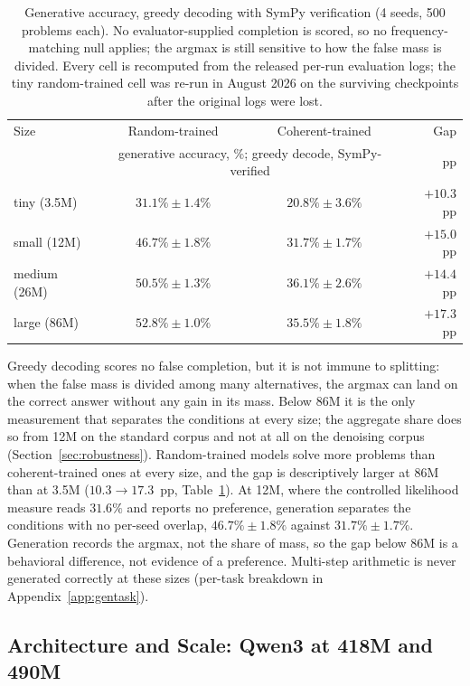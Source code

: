 \documentclass{article}
\begin{document}
\begin{table}[t]
\centering
\small
\begin{tabular}{lccr}
\toprule
Size & Random-trained & Coherent-trained & Gap \\
 & \multicolumn{2}{c}{generative accuracy, \%; greedy decode, SymPy-verified} & pp \\
\midrule
tiny (3.5M)   & $31.1\% \pm 1.4\%$ & $20.8\% \pm 3.6\%$ & $+10.3$ pp \\
small (12M)   & $46.7\% \pm 1.8\%$ & $31.7\% \pm 1.7\%$ & $+15.0$ pp \\
medium (26M)  & $50.5\% \pm 1.3\%$ & $36.1\% \pm 2.6\%$ & $+14.4$ pp \\
large (86M)   & $52.8\% \pm 1.0\%$ & $35.5\% \pm 1.8\%$ & $+17.3$ pp \\
\bottomrule
\end{tabular}
\caption{Generative accuracy, greedy decoding with SymPy verification (4 seeds, 500 problems each). No evaluator-supplied completion is scored, so no frequency-matching null applies; the argmax is still sensitive to how the false mass is divided. Every cell is recomputed from the released per-run evaluation logs; the tiny random-trained cell was re-run in August 2026 on the surviving checkpoints after the original logs were lost.}
\label{tab:generative}
\end{table}

Greedy decoding scores no false completion, but it is not immune to splitting: when the false mass is divided among many alternatives, the argmax can land on the correct answer without any gain in its mass. Below 86M it is the only measurement that separates the conditions at every size; the aggregate share does so from 12M on the standard corpus and not at all on the denoising corpus (Section~\ref{sec:robustness}). Random-trained models solve more problems than coherent-trained ones at every size, and the gap is descriptively larger at 86M than at 3.5M ($10.3 \to 17.3$~pp, Table~\ref{tab:generative}). At 12M, where the controlled likelihood measure reads $31.6\%$ and reports no preference, generation separates the conditions with no per-seed overlap, $46.7\% \pm 1.8\%$ against $31.7\% \pm 1.7\%$. Generation records the argmax, not the share of mass, so the gap below 86M is a behavioral difference, not evidence of a preference. Multi-step arithmetic is never generated correctly at these sizes (per-task breakdown in Appendix~\ref{app:gentask}).

\subsection{Architecture and Scale: Qwen3 at 418M and 490M}
\label{sec:qwen}
\end{document}
